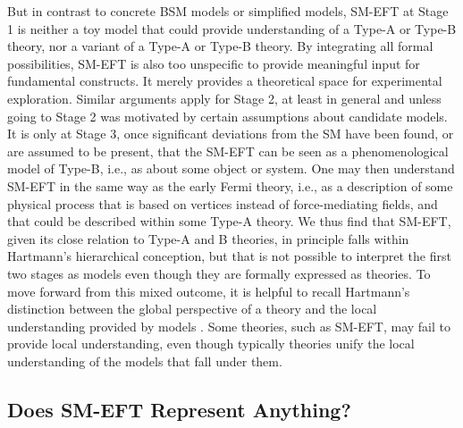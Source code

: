 But in contrast to concrete BSM models or simplified models, SM-EFT at Stage 1 is neither a toy model \citep[see][]{Reutlinger2018} that could provide understanding of a Type-A or Type-B theory, nor a variant of a Type-A or Type-B theory. 
By integrating all formal possibilities, SM-EFT is also too unspecific to provide meaningful input for fundamental constructs. 
It merely provides a theoretical space for experimental exploration.
Similar arguments apply for Stage 2, at least in general and unless going to Stage 2 was motivated by certain assumptions about candidate models.
It is only at Stage 3, once significant deviations from the SM have been found, or are assumed to be present, that the SM-EFT can be seen as
a phenomenological model of Type-B, i.e., as about some object or system.
One may then understand SM-EFT in the same way as the early Fermi theory, i.e., as a description of some physical process that is based on vertices instead of force-mediating fields, and that could be described within some Type-A theory.
We thus find that SM-EFT, given its close relation to Type-A and B theories, in principle falls within Hartmann's hierarchical conception, but that is not possible to interpret the first two stages as models even though they are formally expressed as theories. 
To move forward from this mixed outcome, it is helpful to recall Hartmann's distinction between the global perspective of a theory and the local understanding provided by models \citep{hartmann2001}. 
Some theories, such as SM-EFT, may fail to provide local understanding, even though typically theories unify the local understanding of the models that fall under them.



\subsection{Does SM-EFT Represent Anything?}
\label{sub:smeftrep} 

